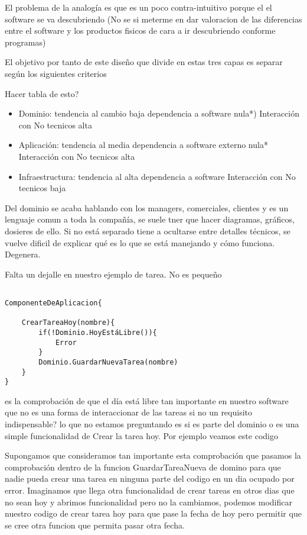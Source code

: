 El problema de la analogía es que es un poco contra-intuitivo porque el el software se va descubriendo (No se si meterme en dar valoracion de las diferencias entre el software y los productos fisicos de cara a ir descubriendo conforme programas)

El objetivo por tanto de este diseño que divide en estas tres capas es separar según los siguientes criterios

Hacer tabla de esto?
\begin{itemize}
    \item Dominio:          tendencia al cambio baja    dependencia a software nula*)    Interacción con No tecnicos alta
    \item Aplicación:       tendencia al media          dependencia a software externo nula* Interacción con No tecnicos alta
    \item Infraestructura:  tendencia al alta           dependencia a software  Interacción con No tecnicos baja
\end{itemize}

Del dominio se acaba hablando con los managers, comerciales, clientes y es un lenguaje comun a toda la compañía, se suele tner que hacer diagramas, gráficos, dosieres de ello. Si no está separado tiene a ocultarse entre detalles técnicos, se vuelve dificil de explicar qué es lo que se está manejando y cómo funciona. Degenera.

Falta un dejalle en nuestro ejemplo de tarea. No es pequeño

\begin{verbatim}

ComponenteDeAplicacion{

    CrearTareaHoy(nombre){
        if(!Dominio.HoyEstáLibre()){
            Error
        }
        Dominio.GuardarNuevaTarea(nombre)
    }
}

\end{verbatim}


es la comprobación de que el día está libre tan importante en nuestro software que no es una forma de interaccionar de las tareas
si no un requisito indispensable? lo que no estamos preguntando es si es parte del dominio o es una simple funcionalidad de Crear la tarea hoy. Por ejemplo veamos este codigo

Supongamos que consideramos tan importante esta comprobación que pasamos la comprobación dentro de la funcion GuardarTareaNueva de domino para que nadie pueda crear una tarea en ninguna parte del codigo en un dia ocupado por error. Imaginamos que llega otra funcionalidad de crear tareas en otros dias que no sean hoy y abrimos funcionalidad pero no la cambiamos, podemos modificar nuestro codigo de crear tarea hoy para que pase la fecha de hoy pero permitir que se cree otra funcion que permita pasar otra fecha.

